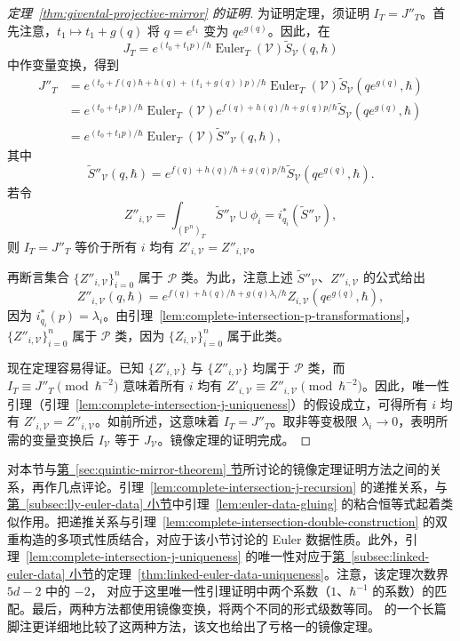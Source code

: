 \begin{proof}[定理~\ref{thm:givental-projective-mirror} 的证明]
为证明定理，须证明 $I_T=J''_T$。首先注意，$t_1\mapsto t_1+g(q)$ 将 $q=e^{t_1}$ 变为 $qe^{g(q)}$。因此，在
\[
J_T=e^{(t_0+t_1p)/\hbar}\operatorname{Euler}_T(\mathcal V)\widetilde S_{\mathcal V}(q,\hbar)
\]
中作变量变换，得到
\[
\begin{aligned}
J''_T&=e^{(t_0+f(q)\hbar+h(q)+(t_1+g(q))p)/\hbar}\operatorname{Euler}_T(\mathcal V)\widetilde S_{\mathcal V}(qe^{g(q)},\hbar)\\
&=e^{(t_0+t_1p)/\hbar}\operatorname{Euler}_T(\mathcal V)e^{f(q)+h(q)/\hbar+g(q)p/\hbar}\widetilde S_{\mathcal V}(qe^{g(q)},\hbar)\\
&=e^{(t_0+t_1p)/\hbar}\operatorname{Euler}_T(\mathcal V)\widetilde S''_{\mathcal V}(q,\hbar),
\end{aligned}
\]
其中
\[
\widetilde S''_{\mathcal V}(q,\hbar)=e^{f(q)+h(q)/\hbar+g(q)p/\hbar}\widetilde S_{\mathcal V}(qe^{g(q)},\hbar).
\]
若令
\[
Z''_{i,\mathcal V}=\int_{(\mathbb P^n)_T}\widetilde S''_{\mathcal V}\cup\phi_i=i_{q_i}^*(\widetilde S''_{\mathcal V}),
\]
则 $I_T=J''_T$ 等价于所有 $i$ 均有 $Z'_{i,\mathcal V}=Z''_{i,\mathcal V}$。

再断言集合 $\{Z''_{i,\mathcal V}\}_{i=0}^n$ 属于 $\mathcal P$ 类。为此，注意上述 $\widetilde S''_{\mathcal V}$、$Z''_{i,\mathcal V}$ 的公式给出
\[
Z''_{i,\mathcal V}(q,\hbar)=e^{f(q)+h(q)/\hbar+g(q)\lambda_i/\hbar}Z_{i,\mathcal V}(qe^{g(q)},\hbar),
\]
因为 $i_{q_i}^*(p)=\lambda_i$。由引理~\ref{lem:complete-intersection-p-transformations}，$\{Z''_{i,\mathcal V}\}_{i=0}^n$ 属于 $\mathcal P$ 类，因为 $\{Z_{i,\mathcal V}\}_{i=0}^n$ 属于此类。

现在定理容易得证。已知 $\{Z'_{i,\mathcal V}\}$ 与 $\{Z''_{i,\mathcal V}\}$ 均属于 $\mathcal P$ 类，而 $I_T\equiv J''_T\pmod{\hbar^{-2}}$ 意味着所有 $i$ 均有 $Z'_{i,\mathcal V}\equiv Z''_{i,\mathcal V}\pmod{\hbar^{-2}}$。因此，唯一性引理（引理~\ref{lem:complete-intersection-j-uniqueness}）的假设成立，可得所有 $i$ 均有 $Z'_{i,\mathcal V}=Z''_{i,\mathcal V}$。如前所述，这意味着 $I_T=J''_T$。取非等变极限 $\lambda_i\to0$，表明所需的变量变换后 $I_{\mathcal V}$ 等于 $J_{\mathcal V}$。镜像定理的证明完成。
\end{proof}
对本节与\hyperref[sec:quintic-mirror-theorem]{第~\ref*{sec:quintic-mirror-theorem} 节}所讨论的镜像定理证明方法之间的关系，再作几点评论。引理~\ref{lem:complete-intersection-j-recursion} 的递推关系，与\hyperref[subsec:lly-euler-data]{第~\ref*{subsec:lly-euler-data} 小节}中引理~\ref{lem:euler-data-gluing} 的粘合恒等式起着类似作用。把递推关系与引理~\ref{lem:complete-intersection-double-construction} 的双重构造的多项式性质结合，对应于该小节讨论的 Euler 数据性质。此外，引理~\ref{lem:complete-intersection-j-uniqueness} 的唯一性对应于\hyperref[subsec:linked-euler-data]{第~\ref*{subsec:linked-euler-data} 小节}的定理~\ref{thm:linked-euler-data-uniqueness}。注意，该定理次数界 $5d-2$ 中的 $-2$，
对应于这里唯一性引理证明中两个系数（$1$、$\hbar^{-1}$ 的系数）的匹配。最后，两种方法都使用镜像变换，将两个不同的形式级数等同。 的一个长篇脚注更详细地比较了这两种方法，该文也给出了亏格一的镜像定理。

